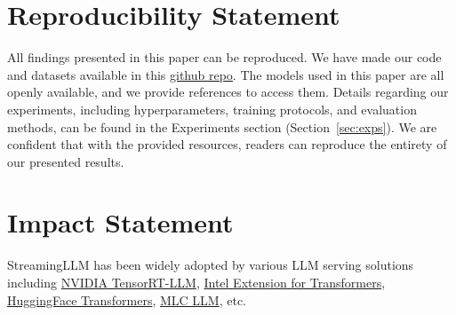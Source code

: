 \documentclass{article} \usepackage{iclr2024_conference,times}
\def\method{StreamingLLM\xspace}
\begin{document}
 
\section*{Reproducibility Statement}
All findings presented in this paper can be reproduced. We have made our code and datasets available in this \href{https://github.com/mit-han-lab/streaming-llm}{github repo}. The models used in this paper are all openly available, and we provide references to access them. Details regarding our experiments, including hyperparameters, training protocols, and evaluation methods, can be found in the Experiments section (Section~\ref{sec:exps}). We are confident that with the provided resources, readers can reproduce the entirety of our presented results.

\section*{Impact Statement}
\method has been widely adopted by various LLM serving solutions including \href{https://github.com/NVIDIA/TensorRT-LLM/tree/main/examples/llama#run-llama-with-streamingllm}{NVIDIA TensorRT-LLM}, \href{https://github.com/intel/intel-extension-for-transformers}{Intel Extension for Transformers}, \href{https://huggingface.co/docs/transformers/v4.39.3/en/internal/generation_utils#transformers.SinkCache}{HuggingFace Transformers}, \href{https://github.com/mlc-ai/mlc-llm/pull/1459}{MLC LLM}, etc.
\end{document}
